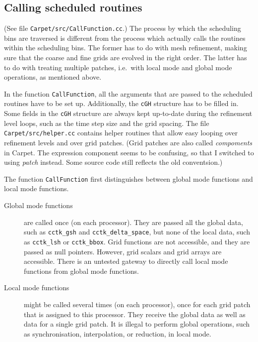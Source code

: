 \documentclass{article}
\begin{document}
\subsection{Calling scheduled routines}

   (See file \texttt{Carpet/src/CallFunction.cc}.)  The process by
   which the scheduling bins are traversed is different from the
   process which actually calls the routines within the scheduling
   bins.  The former has to do with mesh refinement, making sure that
   the coarse and fine grids are evolved in the right order.  The
   latter has to do with treating multiple patches, i.e.\ with local
   mode and global mode operations, as mentioned above.

   In the function \texttt{CallFunction}, all the arguments that are
   passed to the scheduled routines have to be set up.  Additionally,
   the \texttt{cGH} structure has to be filled in.  Some fields in the
   \texttt{cGH} structure are always kept up-to-date during the
   refinement level loops, such as the time step size and the grid
   spacing.  The file \texttt{Carpet/src/helper.cc} contains helper
   routines that allow easy looping over refinement levels and over
   grid patches.  (Grid patches are also called \emph{compoments} in
   Carpet.  The expression component seems to be confusing, so that I
   switched to using \emph{patch} instead.  Some source code still
   reflects the old conventsion.)

   The function \texttt{CallFunction} first distinguishes between
   global mode functions and local mode functions.
\begin{description}
\item[Global mode functions]
   are called once (on each processor).  They are passed all the
   global data, such as \texttt{cctk\_gsh} and
   \texttt{cctk\_delta\_space}, but none of the local data, such as
   \texttt{cctk\_lsh} or \texttt{cctk\_bbox}.  Grid functions are not
   accessible, and they are passed as null pointers.  However, grid
   scalars and grid arrays are accessible.  There is an untested
   gateway to directly call local mode functions from global mode
   functions.
\item[Local mode functions]
   might be called several times (on each processor), once for each
   grid patch that is assigned to this processor.  They receive the
   global data as well as data for a single grid patch.  It is illegal
   to perform global operations, such as synchronisation,
   interpolation, or reduction, in local mode.
\end{description}
\end{document}
